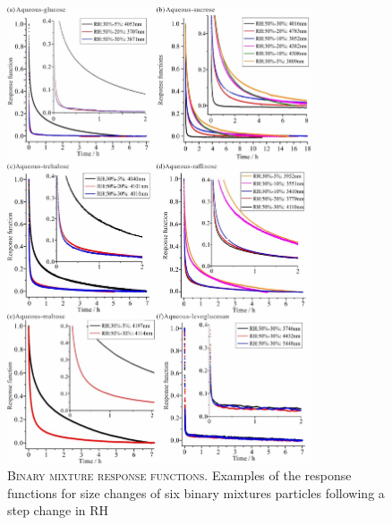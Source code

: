 \begin{figure}
    \centering
    \includegraphics[width=0.8\textwidth]{chapters/water_hopping/figures/image004.jpg}
    \caption[Binary mixture response functions]{\textsc{Binary mixture response functions}. Examples of the response functions for size changes of six binary mixtures particles following a step change in RH}
    \label{fig:wat_s2}
\end{figure}

